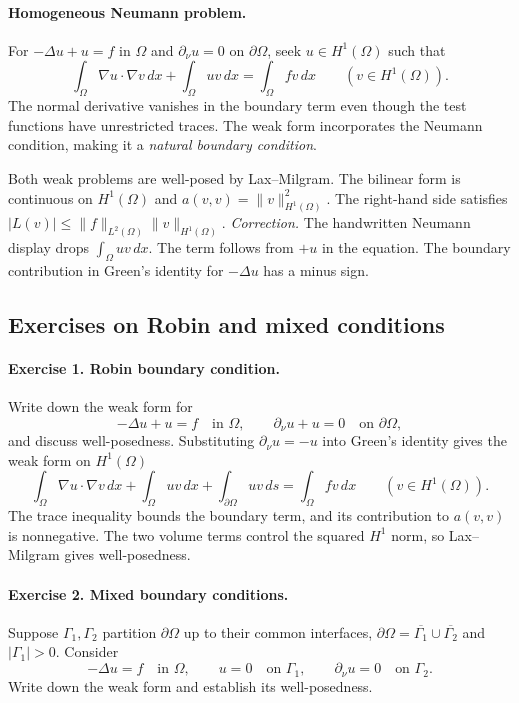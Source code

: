 \documentclass[11pt,a4paper]{article}
\begin{document}
\paragraph{Homogeneous Neumann problem.}
For \(-\Delta u+u=f\) in \(\Omega\) and \(\partial_\nu u=0\)
on \(\partial\Omega\), seek \(u\in H^1(\Omega)\) such that
\[
 \int_\Omega \nabla u\cdot\nabla v\,dx+\int_\Omega uv\,dx
 =\int_\Omega fv\,dx
 \qquad (v\in H^1(\Omega)).
\]
The normal derivative vanishes in the boundary term even though the test
functions have unrestricted traces. The weak form incorporates the Neumann
condition, making it a \emph{natural boundary condition}.

Both weak problems are well-posed by Lax--Milgram. The bilinear form is
continuous on \(H^1(\Omega)\) and
\(a(v,v)=\|v\|_{H^1(\Omega)}^2\). The right-hand side satisfies
\(\lvert L(v)\rvert\le\|f\|_{L^2(\Omega)}\|v\|_{H^1(\Omega)}\).
\emph{Correction.} The handwritten Neumann display drops \(\int_\Omega uv\,dx\).
The term follows from \(+u\) in the equation. The boundary contribution in
Green's identity for \(-\Delta u\) has a minus sign.

\subsection{Exercises on Robin and mixed conditions}

\paragraph{Exercise 1. Robin boundary condition.}
Write down the weak form for
\[
 -\Delta u+u=f\quad\text{in }\Omega,\qquad
 \partial_\nu u+u=0\quad\text{on }\partial\Omega,
\]
and discuss well-posedness. Substituting \(\partial_\nu u=-u\) into Green's
identity gives the weak form on \(H^1(\Omega)\)
\[
 \int_\Omega\nabla u\cdot\nabla v\,dx+\int_\Omega uv\,dx
 +\int_{\partial\Omega}uv\,ds
 =\int_\Omega fv\,dx\qquad (v\in H^1(\Omega)).
\]
The trace inequality bounds the boundary term, and its contribution to
\(a(v,v)\) is nonnegative. The two volume terms control the squared \(H^1\)
norm, so Lax--Milgram gives well-posedness.

\paragraph{Exercise 2. Mixed boundary conditions.}
Suppose \(\Gamma_1,\Gamma_2\) partition \(\partial\Omega\) up to their common
interfaces, \(\partial\Omega=\overline{\Gamma_1}\cup\overline{\Gamma_2}\)
and \(\lvert\Gamma_1\rvert>0\). Consider
\[
 -\Delta u=f\quad\text{in }\Omega,\qquad
 u=0\quad\text{on }\Gamma_1,\qquad
 \partial_\nu u=0\quad\text{on }\Gamma_2.
\]
Write down the weak form and establish its well-posedness.
\end{document}

